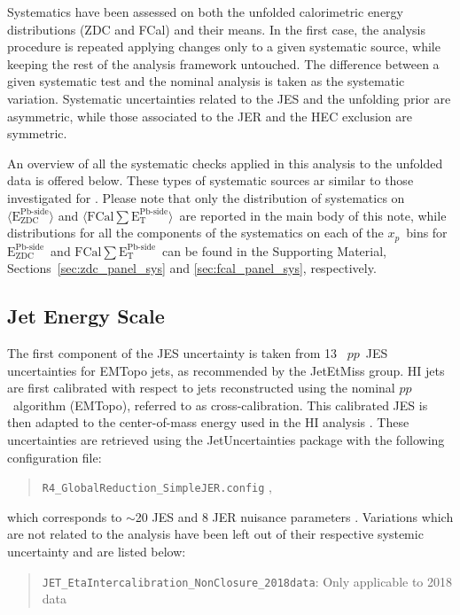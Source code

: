 \documentclass[NOTE, atlasdraft=true, texlive=2020, UKenglish]{atlasdoc}
\newcommand{\EZDC}{$\text{E}_\text{ZDC}^\text{Pb-side}$}
\newcommand{\EAZDC}{\langle \text{E}_\text{ZDC}^\text{Pb-side} \rangle}
\newcommand{\EATPB}{$\langle \text{FCal} \sum \text{E}_{\text{T}}^{\text{Pb-side} } \rangle$}
\newcommand{\ETPB}{$\text{FCal} \sum \text{E}_{\text{T}}^{\text{Pb-side} }$}
\newcommand{\xp}{$x_{p}$}
\newcommand{\pxp}{$pp$}
\begin{document}
Systematics have been assessed on both the unfolded calorimetric energy distributions (ZDC and FCal) and their means. In the first case, the analysis procedure is repeated applying changes only to a given systematic source, while keeping the rest of the analysis framework untouched. The difference between a given  systematic test and the nominal analysis is taken as the systematic variation. Systematic uncertainties related to the JES and the unfolding prior are asymmetric, while those associated to the JER and the HEC exclusion are symmetric. 

An overview of all the systematic checks applied in this analysis to the unfolded data is offered below. These types of systematic sources ar similar to those investigated for \cite{Longo:2860813}. Please note that only the distribution of systematics on $\EAZDC$ and \EATPB\ are reported in the main body of this note, while distributions for all the components of the systematics on each of the \xp\ bins for \EZDC\ and \ETPB\ can be found in the Supporting Material, Sections~\ref{sec:zdc_panel_sys} and \ref{sec:fcal_panel_sys}, respectively. 


\subsection{Jet Energy Scale}
The first component of the JES uncertainty is taken from 13 \TeV\ \pxp\ JES uncertainties for EMTopo jets, as recommended by the JetEtMiss group. HI jets are first calibrated with respect to jets reconstructed using the nominal \pxp\ algorithm (EMTopo), referred to as cross-calibration. This calibrated JES is then adapted to the center-of-mass energy used in the HI analysis \cite{2016:JetCali}. These uncertainties are retrieved using the JetUncertainties package with the following configuration file:
\begin{quote}
\centering
\texttt{R4\_GlobalReduction\_SimpleJER.config} ,
\end{quote}
which corresponds to $\sim$20 JES and 8 JER nuisance parameters \cite{2018:JESJER_NP}. Variations which are not related to the analysis have been left out of their respective systemic uncertainty and are listed below:
\begin{quote}
\centering
   \texttt{JET\_EtaIntercalibration\_NonClosure\_2018data}: Only applicable to 2018 data 
\end{quote}
\end{document}
